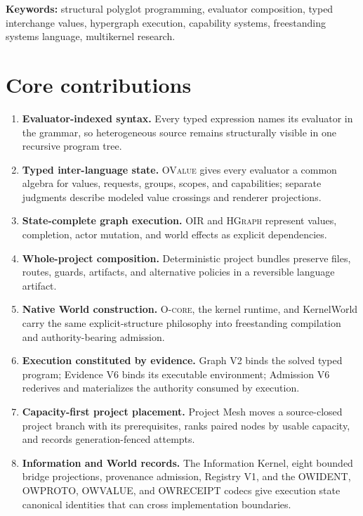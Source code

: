 \documentclass[11pt,oneside]{article}
\newcommand{\ovalue}{\textsc{OValue}}
\newcommand{\oir}{\textsc{OIR}}
\newcommand{\hgraph}{\textsc{HGraph}}
\newcommand{\ocore}{\textsc{O-core}}
\begin{document}
\vspace{0.15in}
\textbf{Keywords:} structural polyglot programming, evaluator composition,
typed interchange values, hypergraph execution, capability systems,
freestanding systems language, multikernel research.

\clearpage
\section*{Core contributions}

\begin{claimbox}
\begin{enumerate}
  \item \textbf{Evaluator-indexed syntax.} Every typed expression names its
        evaluator in the grammar, so heterogeneous source remains structurally
        visible in one recursive program tree.
  \item \textbf{Typed inter-language state.} \ovalue{} gives every evaluator a
        common algebra for values, requests, groups, scopes, and capabilities;
        separate judgments describe modeled value crossings and renderer
        projections.
  \item \textbf{State-complete graph execution.} \oir{} and \hgraph{}
        represent values, completion, actor mutation, and world effects as
        explicit dependencies.
  \item \textbf{Whole-project composition.} Deterministic project bundles
        preserve files, routes, guards, artifacts, and alternative policies in
        a reversible language artifact.
  \item \textbf{Native World construction.} \ocore{}, the kernel runtime, and
        KernelWorld carry the same explicit-structure philosophy into
        freestanding compilation and authority-bearing admission.
  \item \textbf{Execution constituted by evidence.} Graph V2 binds the solved
        typed program; Evidence V6 binds its executable environment; Admission
        V6 rederives and materializes the authority consumed by execution.
  \item \textbf{Capacity-first project placement.} Project Mesh moves a
        source-closed project branch with its prerequisites, ranks paired nodes
        by usable capacity, and records generation-fenced attempts.
  \item \textbf{Information and World records.} The Information Kernel,
        eight bounded bridge projections, provenance admission, Registry V1,
        and the OWIDENT, OWPROTO, OWVALUE, and OWRECEIPT codecs give execution
        state canonical identities that can cross implementation boundaries.
\end{enumerate}
\end{claimbox}
\end{document}
